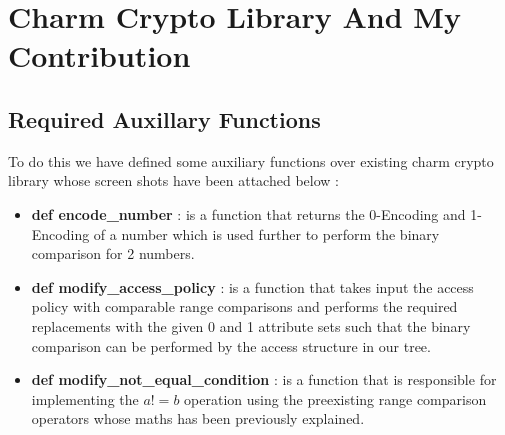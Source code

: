 

\chapter{Charm Crypto Library And My Contribution}
\section{Required Auxillary Functions}

To do this we have defined some auxiliary functions over existing charm crypto library whose screen shots have been attached below :
\begin{itemize}
    \item \textbf{def encode\_number} : is a function that returns the 0-Encoding and 1-Encoding of a number which is used further to perform the binary comparison for 2 numbers.
    \item \textbf{def modify\_access\_policy} : is a function that takes input the access policy with comparable range comparisons and performs the required replacements with the given 0 and 1 attribute sets such that the binary comparison can be performed by the access structure in our tree.
    \item \textbf{def modify\_not\_equal\_condition} : is a function that is responsible for implementing the \(a !=b \) operation using the preexisting range comparison operators whose maths has been previously explained.
\end{itemize}



